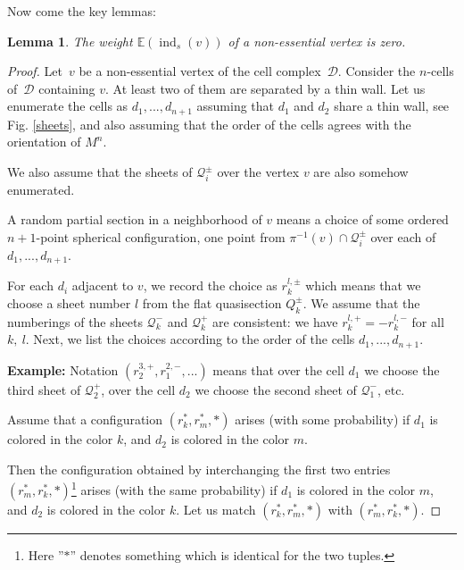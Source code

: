 \documentclass[12pt]{amsart}
\theoremstyle{plain}
\newtheorem{lemma}[theorem]{Lemma}
\theoremstyle{definition}
\theoremstyle{plain}
\theoremstyle{definition}
\DeclareMathOperator{\ind}{ind}
\begin{document}
  
 
 
 
  
  
 
  

Now come the key lemmas:
 
 
  \begin{lemma}\label{LemmaNonEss}
   {The weight $\mathbb{E}(\ind_s(v))$ of a non-essential vertex is zero.}
  \end{lemma}
  
  \begin{proof}
  Let~$v$ be a non-essential vertex of the cell complex~${\mathcal{D}}$.  Consider the $n$-cells of~${\mathcal{D}}$ containing $v$. At least two of them are separated by a thin wall.
  Let us enumerate the cells as $d_1,...,d_{n+1}$ assuming that $d_1$ and $d_2$ share a thin wall, see Fig. \ref{sheets}, and also assuming that the order of the cells agrees with the orientation of $M^n$.
  
  We also assume that the sheets of $\mathcal{Q}_i^\pm$ over the vertex $v$ are also somehow enumerated.
  
 
 
  A random partial section  {in a neighborhood of}  $v$  means a choice of some ordered~$n+1$-point spherical configuration, one point from $\pi^{-1}(v)\cap \mathcal{Q}_i^\pm$  over each of $d_1,...,d_{n+1}$. 
  
  For each $d_i$ adjacent to $v$, we record the choice as $r_k^{l,\pm}$ which means that we choose a sheet number $l$ from the flat quasisection $Q_k^\pm$.
  We assume that the numberings of the sheets $\mathcal{Q}_k^-$ and $\mathcal{Q}_k^+$ are consistent: we have $r_k^{l,+}=-r_k^{l,-}$  for all $k,\ l$.
  Next, we list the choices according to the order  of the cells $d_1,...,d_{n+1}$. 
  
  \medskip
  \textbf{Example:} Notation $(r_2^{3,+}, r_1^{2,-},...)$ means that over the cell $d_1$ we choose the third sheet of $\mathcal{Q}_2^+$, over  the cell $d_2$ we choose
  the second sheet of $\mathcal{Q}_1^-$, etc.
  
  
  \medskip
  
  Assume that a configuration $(r_k^*,r_m^*,*)$ arises (with some probability) if $d_1$ is colored in the color $k$, and $d_2$ is colored in the color $m$.
  
 Then the configuration obtained by interchanging the first two entries $(r_m^*,r_k^*,*)$\footnote{Here ''$*$'' denotes something which is identical for the two tuples.} arises (with the same probability) if $d_1$ is colored in the color $m$, and $d_2$ is colored in the color $k$.
 Let us  match $(r_k^*,r_m^*,*)$ with  $(r_m^*,r_k^*,*)$.
  

\end{proof}
\end{document}
